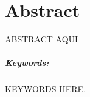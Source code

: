 \chapter*{Abstract}
\thispagestyle{empty}

ABSTRACT AQUI

\vspace{50pt}

\paragraph{Keywords:} KEYWORDS HERE.


